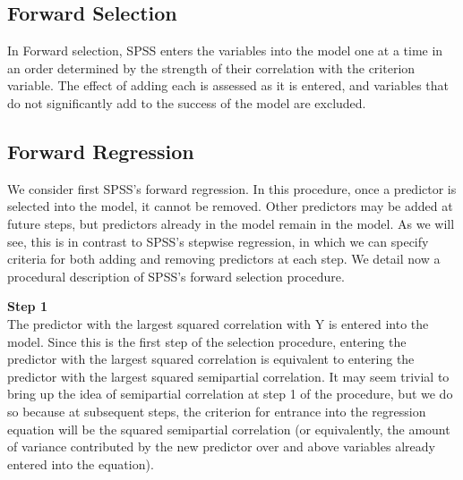 \documentclass[a4paper,12pt]{article}
\begin{document}
\subsection{Forward Selection}
In Forward selection, SPSS enters the variables into the model one at a time in an
order determined by the strength of their correlation with the criterion variable. The effect of adding each is assessed as it is entered, and variables that do not significantly add to the success of the model are excluded.

\subsection{Forward Regression}
We consider first SPSS’s forward regression. In this procedure, once a predictor is selected into the model, it cannot be removed. Other predictors may be added at future steps, but predictors already in the model remain in the model. As we will see, this is in contrast to SPSS’s stepwise regression, in which we can specify criteria for both adding and removing predictors at each step.
We detail now a procedural description of SPSS’s forward selection procedure.

\textbf{Step 1}\\
The predictor with the largest squared correlation with Y is entered into the model. Since this is the first step of the selection procedure, entering the predictor with the largest squared correlation is equivalent to entering the predictor with the largest squared semipartial correlation. It may seem trivial to bring up the idea of semipartial correlation at step 1 of the procedure, but we do so because at subsequent steps, the criterion for entrance into the regression equation will be the squared semipartial correlation (or equivalently, the amount of variance contributed by the new predictor over and above variables already entered into the equation).
\end{document}
